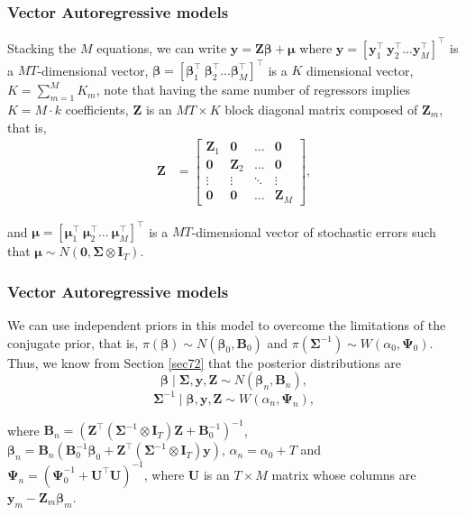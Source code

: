 \documentclass[12pt, compress]{beamer}
\begin{document}
\begin{frame}
	\frametitle{Vector Autoregressive models}
Stacking the $M$ equations, we can write $\bm{y}=\bm{Z}\bm{\beta}+\bm{\mu}$ where $\bm{y}=\left[\bm{y}_{1}^{\top} \ \bm{y}_{2}^{\top} ... \bm{y}_{M}^{\top}\right]^{\top}$ is a $MT$-dimensional vector,  $\bm{\beta}=\left[\bm{\beta}_{1}^{\top} \ \bm{\beta}_{2}^{\top} \ldots \bm{\beta}_{M}^{\top}\right]^{\top}$ is a $ K$ dimensional vector, $K=\sum_{m=1}^{M} K_m$, note that having the same number of regressors implies $K = M \cdot k$ coefficients, $\bm{Z}$ is an $MT\times K$ block diagonal matrix composed of $\bm{Z}_{m}$, that is,
\begin{align*}
	\bm{Z}&=\begin{bmatrix}
		\bm{Z}_1 & \bm{0} & \dots & \bm{0}\\
		\bm{0} & \bm{Z}_2 & \dots & \bm{0}\\
		\vdots & \vdots & \ddots & \vdots\\
		\bm{0} & \bm{0} & \dots & \bm{Z}_M		
	\end{bmatrix},
\end{align*}  

and $\bm{\mu}=\left[\bm{\mu}_{1}^{\top} \ \bm{\mu}_{2}^{\top} \dots \ \bm{\mu}_{M}^{\top}\right]^{\top}$ is a $MT$-dimensional vector of stochastic errors such that $\bm{\mu}\sim{N}(\bm{0},\bm{\Sigma}\otimes \bm{I}_T)$.
\end{frame}

\begin{frame}
	\frametitle{Vector Autoregressive models}
We can use independent priors in this model to overcome the limitations of the conjugate prior, that is, $\pi(\bm{\beta})\sim{N}(\bm{\beta}_0,\bm{B}_0)$ and $\pi(\bm{\Sigma}^{-1})\sim{W}(\alpha_0,\bm{\Psi}_0)$. Thus, we know from Section \ref{sec72} that the posterior distributions are
\begin{equation*}
	\bm{\beta}\mid \bm{\Sigma}, \bm{y}, \bm{Z} \sim {N}(\bm{\beta}_n, \bm{B}_n), 
\end{equation*}
\begin{equation*}
	\bm{\Sigma}^{-1}\mid \bm{\beta}, \bm{y}, \bm{Z} \sim {W}(\alpha_n, \bm{\Psi}_n),
\end{equation*}

where $\bm{B}_n=(\bm{Z}^{\top}(\bm{\Sigma}^{-1}\otimes \bm{I}_T )\bm{Z}+\bm{B}_0^{-1})^{-1}$, $\bm{\beta}_n=\bm{B}_n(\bm{B}_0^{-1}\bm{\beta}_0 + \bm{Z}^{\top}(\bm{\Sigma}^{-1}\otimes \bm{I}_T)\bm{y})$, $\alpha_n = \alpha_0 + T$ and $\bm{\Psi}_n = (\bm{\Psi}_0^{-1} + \bm{U}^{\top}\bm{U})^{-1}$, where $\bm{U}$ is an $T\times M$ matrix whose columns are $\bm{y}_m-\bm{Z}_m\bm{\beta}_m$.
\end{frame}
\end{document}
